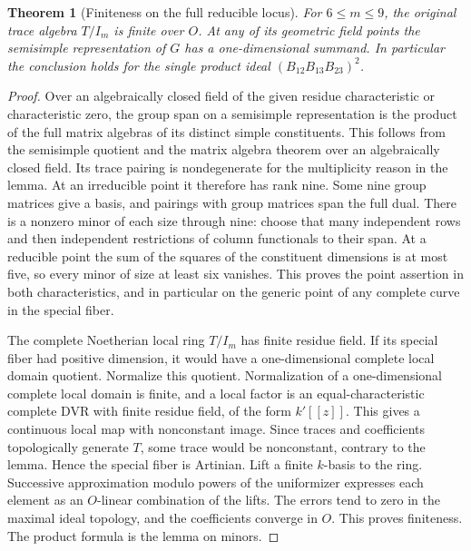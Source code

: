 \documentclass[a4paper,11pt]{article}
\newtheorem{theorem}[proposition]{Theorem}
\theoremstyle{definition}
\theoremstyle{remark}
\numberwithin{equation}{section}
\begin{document}
\begin{theorem}[Finiteness on the full reducible locus]
\label{thm:reducibleminors378}
For \(6\le m\le9\), the original trace algebra \(T/I_m\) is
finite over \(O\). At any of its geometric field points
the semisimple representation of \(G\) has a one-dimensional
summand. In particular the conclusion holds for the single
product ideal \((B_{12}B_{13}B_{23})^2\).
\end{theorem}
\begin{proof}
Over an algebraically closed field of the given residue
characteristic or characteristic zero, the group span on
a semisimple representation is the product of the full
matrix algebras of its distinct simple constituents.
This follows from the semisimple quotient and the matrix
algebra theorem over an algebraically closed field.
Its trace pairing is nondegenerate for the multiplicity
reason in the lemma. At an irreducible point it therefore
has rank nine. Some nine group matrices give a basis,
and pairings with group matrices span the full dual.
There is a nonzero minor of each size through nine:
choose that many independent rows and then independent
restrictions of column functionals to their span.
At a reducible point the sum of the squares of the
constituent dimensions is at most five, so every minor
of size at least six vanishes. This proves the point
assertion in both characteristics, and in particular
on the generic point of any complete curve in the
special fiber.

The complete Noetherian local ring \(T/I_m\) has finite
residue field. If its special fiber had positive dimension,
it would have a one-dimensional complete local domain
quotient. Normalize this quotient. Normalization of a
one-dimensional complete local domain is finite, and a
local factor is an equal-characteristic complete DVR with
finite residue field, of the form \(k'[[z]]\). This gives
a continuous local map with nonconstant image. Since
traces and coefficients topologically generate \(T\),
some trace would be nonconstant, contrary to the lemma.
Hence the special fiber is Artinian. Lift a finite
\(k\)-basis to the ring. Successive approximation modulo
powers of the uniformizer expresses each element as an
\(O\)-linear combination of the lifts. The errors tend
to zero in the maximal ideal topology, and the coefficients
converge in \(O\). This proves finiteness. The product
formula is the lemma on minors.
\end{proof}
\end{document}
